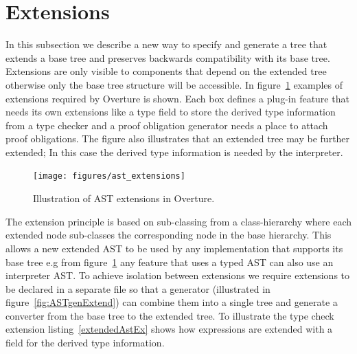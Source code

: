 \documentclass{overturerepchap}
\begin{document}
\section{Extensions}



In this subsection we describe a new way to specify and generate a tree that extends a base tree and preserves backwards compatibility with its base tree. Extensions are only visible to components that depend on the extended tree otherwise only the base tree structure will be accessible. In figure~\ref{fig:ast_extensions} examples of extensions required by Overture is shown. Each box defines a plug-in feature that needs its own extensions like a type field to store the derived type information from a type checker and a proof obligation generator needs a place to attach proof obligations. The figure also illustrates that an extended tree may be further extended; In this case the derived type information is needed by the interpreter. 

\begin{figure}[tbh]
\centering
\texttt{[image: figures/ast\_extensions]}
\caption{Illustration of AST extensions in Overture.\label{fig:ast_extensions}}
\end{figure}

The extension principle is based on sub-classing from a class-hierarchy where each extended node sub-classes the corresponding node in the base hierarchy. This allows a new extended AST to be used by any implementation that supports its base tree e.g from figure~\ref{fig:ast_extensions} any feature that uses a typed AST can also use an interpreter AST.
To achieve isolation between extensions we require extensions to be declared in a separate file so that a generator (illustrated in figure~\ref{fig:ASTgenExtend}) can combine them into a single tree and generate a converter from the base tree to the extended tree. To illustrate the type check extension listing~\ref{extendedAstEx} shows how expressions are extended with a field for the derived type information.
\end{document}
